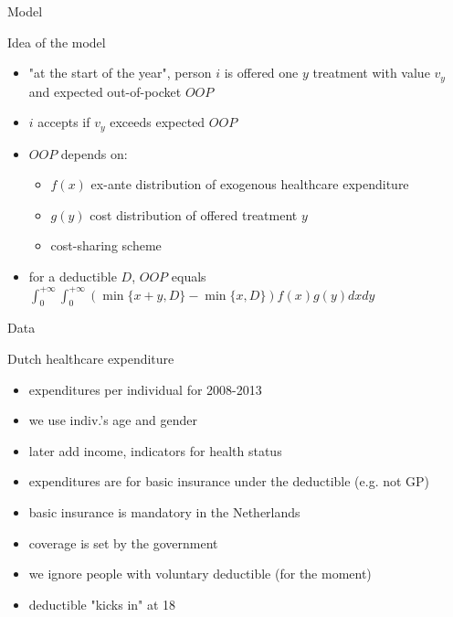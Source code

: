 \documentclass[presentation]{beamer}
\begin{document}
\begin{frame}[label={sec:org8b91621}]{Model}
\begin{block}{Idea of the model}
\begin{itemize}
\item "at the start of the year", person \(i\) is offered one \(y\) treatment with value \(v_y\) and expected out-of-pocket \(OOP\)
\item \(i\) accepts if \(v_y\) exceeds expected \(OOP\)

\item \(OOP\) depends on:
\begin{itemize}
\item \(f(x)\) ex-ante distribution of exogenous healthcare expenditure
\item \(g(y)\) cost distribution of offered treatment \(y\)
\item cost-sharing scheme
\end{itemize}
\item for a deductible \(D\), \(OOP\) equals \(\int_0^{+\infty} \int_0^{+\infty} (\min\{x+y,D\}-\min\{x,D\})f(x)g(y)dxdy\)
\end{itemize}
\end{block}
\end{frame}


\begin{frame}[label={sec:orga870408}]{Data}
\begin{block}{Dutch healthcare expenditure}
\begin{itemize}
\item expenditures per individual for 2008-2013
\item we use indiv.'s age and gender
\item later add income, indicators for health status
\item expenditures are for basic insurance under the deductible (e.g. not GP)
\item basic insurance is mandatory in the Netherlands
\item coverage is set by the government
\item we ignore people with voluntary deductible (for the moment)
\item deductible "kicks in" at 18
\end{itemize}
\end{block}
\end{frame}
\end{document}
